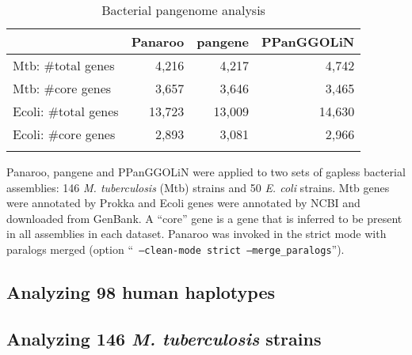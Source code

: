 \documentclass[webpdf,contemporary,large,namedate]{oup-authoring-template}%
\begin{document}
\begin{table}[!tb]
\caption{Bacterial pangenome analysis\label{tab:bac}}
\begin{tabular*}{\columnwidth}{@{\extracolsep\fill}lrrr@{\extracolsep\fill}}
\toprule
& Panaroo & pangene & PPanGGOLiN\\
\midrule
Mtb: \#total genes   & 4,216  & 4,217  & 4,742  \\
Mtb: \#core genes    & 3,657  & 3,646  & 3,465  \\
Ecoli: \#total genes & 13,723 & 13,009 & 14,630 \\
Ecoli: \#core genes  & 2,893  & 3,081  & 2,966  \\
\botrule
\end{tabular*}
\begin{tablenotes}
\item Panaroo, pangene and PPanGGOLiN were applied to two sets of gapless bacterial assemblies:
146 \emph{M. tuberculosis} (Mtb) strains and 50 \emph{E. coli} strains.
Mtb genes were annotated by Prokka and Ecoli genes were annotated by NCBI and downloaded from GenBank.
A ``core'' gene is a gene that is inferred to be present in all assemblies in each dataset.
Panaroo was invoked in the strict mode with paralogs merged (option ``{\tt
--clean-mode strict --merge\_paralogs}'').
\end{tablenotes}
\end{table}

\subsection{Analyzing 98 human haplotypes}

\subsection{Analyzing 146 \textit{M. tuberculosis} strains}
\end{document}
